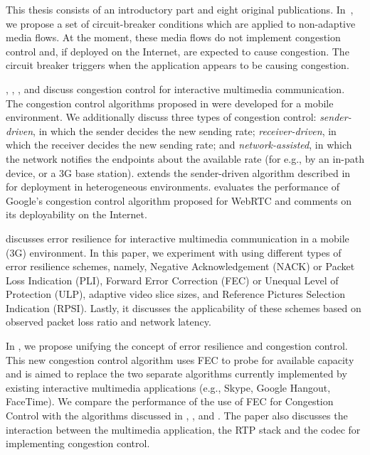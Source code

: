 This thesis consists of an introductory part and eight original publications.
In~, we propose a set of circuit-breaker conditions which are
applied to non-adaptive media flows. At the moment, these media flows do not
implement congestion control and, if deployed on the Internet, are expected to
cause congestion. The circuit breaker triggers when the application appears to
be causing congestion.

, , , and 
discuss congestion control for interactive multimedia communication. The
congestion control algorithms proposed in  were developed for
a mobile environment. We additionally discuss three types of congestion
control:  \emph{sender-driven}, in which the sender decides the new sending rate; 
\emph{receiver-driven}, in which the receiver decides the new sending rate; and 
\emph{network-assisted}, in which the network notifies the endpoints about the available
rate (for e.g., by an in-path device, or a 3G base station). 
extends the sender-driven algorithm described in  for
deployment in heterogeneous environments.  evaluates the
performance of Google's congestion control algorithm proposed for WebRTC and
comments on its deployability on the Internet.

 discusses error resilience for interactive multimedia
communication in a mobile (3G) environment. In this paper, we experiment with
using different types of error resilience schemes, namely, Negative
Acknowledgement (NACK) or Packet Loss Indication (PLI), Forward Error
Correction (FEC) or Unequal Level of Protection (ULP), adaptive video slice
sizes, and Reference Pictures Selection Indication (RPSI). Lastly, it
discusses the applicability of these schemes based on observed packet loss
ratio and network latency.

In , we propose unifying the concept of error resilience and
congestion control. This new congestion control algorithm uses FEC to probe
for available capacity and is aimed to replace the two separate algorithms currently
implemented by existing interactive multimedia applications (e.g., Skype,
Google Hangout, FaceTime). We compare the performance of the use of FEC for
Congestion Control with the algorithms discussed in ,
, and . The paper also discusses the
interaction between the multimedia application, the RTP stack and the codec
for implementing congestion control.


